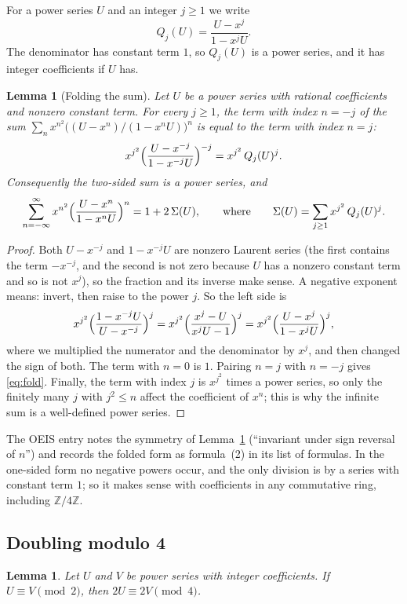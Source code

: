\documentclass[11pt,a4paper]{article}
\newtheorem{lemma}[theorem]{Lemma}
\theoremstyle{definition}
\theoremstyle{remark}
\newcommand{\Z}{\mathbb{Z}}
\begin{document}
For a power series $U$ and an integer $j\ge1$ we write
\[
Q_j(U)=\frac{U-x^j}{1-x^jU}.
\]
The denominator has constant term $1$, so $Q_j(U)$ is a power series, and it has integer coefficients if $U$
has.

\begin{lemma}[Folding the sum]\label{lem:fold}
Let $U$ be a power series with rational coefficients and nonzero constant term. For every $j\ge1$, the term with index
$n=-j$ of the sum $\sum_{n}x^{n^2}\bigl((U-x^n)/(1-x^nU)\bigr)^n$ is equal to the term with index $n=j$:
\[
x^{j^2}\Bigl(\frac{U-x^{-j}}{1-x^{-j}U}\Bigr)^{-j}=x^{j^2}\,Q_j(U)^j .
\]
Consequently the two-sided sum is a power series, and
\begin{equation}\label{eq:fold}
\sum_{n=-\infty}^{\infty}x^{n^2}\Bigl(\frac{U-x^n}{1-x^nU}\Bigr)^n=1+2\,\Sigma(U),
\qquad\text{where}\qquad
\Sigma(U)=\sum_{j\ge1}x^{j^2}\,Q_j(U)^j .
\end{equation}
\end{lemma}

\begin{proof}
Both $U-x^{-j}$ and $1-x^{-j}U$ are nonzero Laurent series (the first contains the term $-x^{-j}$, and the second is
not zero because $U$ has a nonzero constant term and so is not $x^j$), so the fraction and its inverse make sense. A negative
exponent means: invert, then raise to the power $j$. So the left side is
\[
x^{j^2}\Bigl(\frac{1-x^{-j}U}{U-x^{-j}}\Bigr)^{j}
=x^{j^2}\Bigl(\frac{x^j-U}{x^jU-1}\Bigr)^{j}
=x^{j^2}\Bigl(\frac{U-x^j}{1-x^jU}\Bigr)^{j},
\]
where we multiplied the numerator and the denominator by $x^j$, and then changed the sign of both. The term with
$n=0$ is $1$. Pairing $n=j$ with $n=-j$ gives \eqref{eq:fold}. Finally, the term with index $j$ is $x^{j^2}$ times a
power series, so only the finitely many $j$ with $j^2\le n$ affect the coefficient of $x^n$; this is why the infinite
sum is a well-defined power series.
\end{proof}

The OEIS entry notes the symmetry of Lemma~\ref{lem:fold} (``invariant under sign reversal of $n$'') and records the
folded form as formula~(2) in its list of formulas. In the one-sided form no negative powers occur, and the only division is by a
series with constant term $1$; so it makes sense with coefficients in any commutative ring, including $\Z/4\Z$.

\subsection{Doubling modulo 4}
\begin{lemma}\label{lem:double}
Let $U$ and $V$ be power series with integer coefficients. If $U\equiv V\pmod 2$, then $2U\equiv2V\pmod 4$.
\end{lemma}
\end{document}
